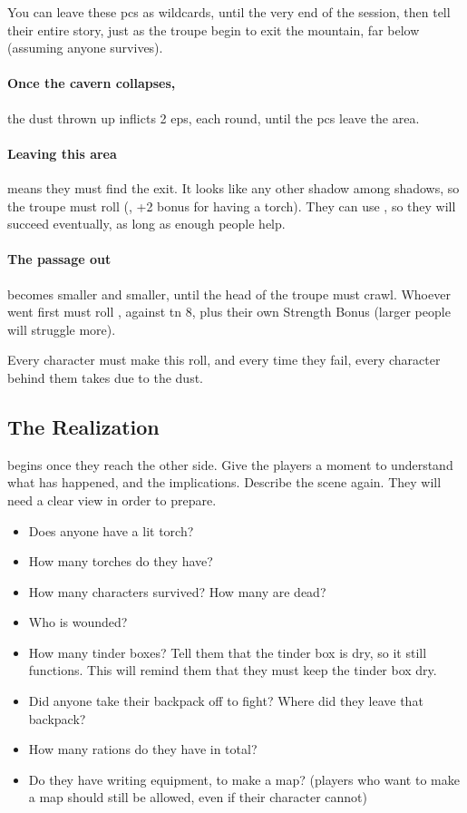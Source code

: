 \begin{multicols}{2}
You can leave these \glspl{pc} as wildcards, until the very end of the session, then tell their entire story, just as the troupe begin to exit the mountain, far below (assuming anyone survives).

\paragraph{Once the cavern collapses,}
the dust thrown up inflicts 2 \glspl{ep}, each round, until the \glspl{pc} leave the \gls{area}.

\paragraph{Leaving this area}
means they must find the exit.
It looks like any other shadow among shadows, so the troupe must roll  (\tn[10], +2 bonus for having a torch).
They can use , so they will succeed eventually, as long as enough people help.

\paragraph{The passage out}
becomes smaller and smaller, until the head of the troupe must crawl.
Whoever went first must roll , against \gls{tn} 8, plus their own Strength Bonus (larger people will struggle more).

Every character must make this roll, and every time they fail, every character behind them takes  due to the dust.

\subsection{The Realization}
begins once they reach the other side.
Give the players a moment to understand what has happened, and the implications.
Describe the scene again.
They will need a clear view in order to prepare.

\begin{itemize}
  \item
  Does anyone have a lit torch?
  \item
  How many torches do they have?
  \item
  How many characters survived?
  How many are dead?
  \item
  Who is wounded?
  \item
  How many tinder boxes?
  Tell them that the tinder box is dry, so it still functions.
  This will remind them that they must keep the tinder box dry.
  \item
  Did anyone take their backpack off to fight?
  Where did they leave that backpack?
  \item
  How many rations do they have in total?
  \item
  Do they have writing equipment, to make a map?
  (players who want to make a map should still be allowed, even if their character cannot)
\end{itemize}


\end{multicols}
